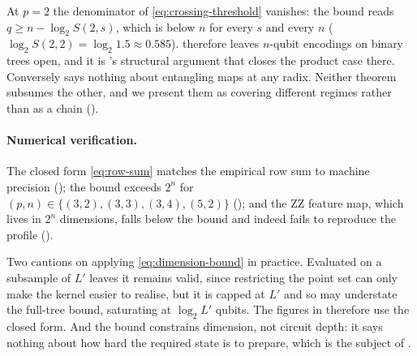 \begin{remark}
  \label{rem:complementarity}
  At $p = 2$ the denominator of \cref{eq:crossing-threshold} vanishes: the bound reads
  $q \ge n - \log_2 S(2,s)$, which is below $n$ for every $s$ and every $n$
  ($\log_2 S(2,2) = \log_2 1.5 \approx 0.585$).  therefore leaves $n$-qubit
  encodings on binary trees open, and it is 's structural
  argument that closes the product case there. Conversely  says
  nothing about entangling maps at any radix. Neither theorem subsumes the other, and
  we present them as covering different regimes rather than as a chain
  ().
\end{remark}

\paragraph{Numerical verification.}
The closed form \cref{eq:row-sum} matches the empirical row sum to machine precision
(); the bound exceeds $2^{n}$ for
$(p,n) \in \{(3,2),(3,3),(3,4),(5,2)\}$
(); and the ZZ feature
map, which lives in $2^{n}$ dimensions, falls below the bound and indeed fails to
reproduce the profile
().

Two cautions on applying \cref{eq:dimension-bound} in practice. Evaluated on a
subsample of $L'$ leaves it remains valid, since restricting the point set can only
make the kernel easier to realise, but it is capped at $L'$ and so may understate the
full-tree bound, saturating at $\log_2 L'$ qubits. The figures in
 therefore use the closed form. And the bound constrains
dimension, not circuit depth: it says nothing about how hard the required state is to
prepare, which is the subject of .
